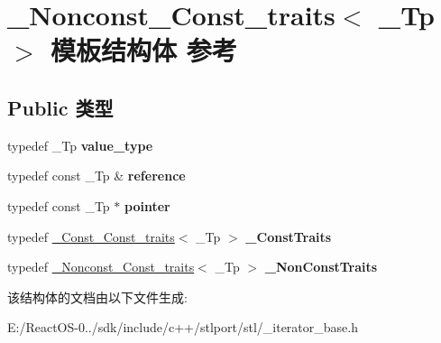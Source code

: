 \hypertarget{struct___nonconst___const__traits}{}\section{\+\_\+\+Nonconst\+\_\+\+Const\+\_\+traits$<$ \+\_\+\+Tp $>$ 模板结构体 参考}
\label{struct___nonconst___const__traits}
\subsection*{Public 类型}
\begin{DoxyCompactItemize}
\item 
\mbox{\label{struct___nonconst___const__traits_a3ef180797c34d5593eb27652c2bf38ac}} 
typedef \+\_\+\+Tp {\bfseries value\+\_\+type}
\item 
\mbox{\label{struct___nonconst___const__traits_a3003dd6cfba312aae30df144f79ea436}} 
typedef const \+\_\+\+Tp \& {\bfseries reference}
\item 
\mbox{\label{struct___nonconst___const__traits_a88b3dff3279fddd9ca790560b6ab7a21}} 
typedef const \+\_\+\+Tp $\ast$ {\bfseries pointer}
\item 
\mbox{\label{struct___nonconst___const__traits_a49b16d7d75b9fbdd6a2ab4468539ef49}} 
typedef \hyperlink{struct___const___const__traits}{\+\_\+\+Const\+\_\+\+Const\+\_\+traits}$<$ \+\_\+\+Tp $>$ {\bfseries \+\_\+\+Const\+Traits}
\item 
\mbox{\label{struct___nonconst___const__traits_a69b9dcd2f7615bc071e87856ce71023c}} 
typedef \hyperlink{struct___nonconst___const__traits}{\+\_\+\+Nonconst\+\_\+\+Const\+\_\+traits}$<$ \+\_\+\+Tp $>$ {\bfseries \+\_\+\+Non\+Const\+Traits}
\end{DoxyCompactItemize}


该结构体的文档由以下文件生成\+:\begin{DoxyCompactItemize}
\item 
E\+:/\+React\+O\+S-\/0../sdk/include/c++/stlport/stl/\+\_\+iterator\+\_\+base.\+h\end{DoxyCompactItemize}
